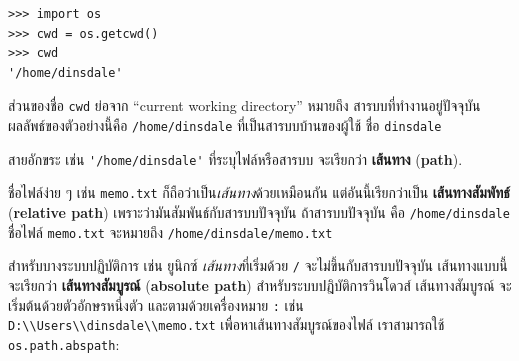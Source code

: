 \begin{verbatim}
>>> import os
>>> cwd = os.getcwd()
>>> cwd
'/home/dinsdale'
\end{verbatim}
%
%
ส่วนของชื่อ \texttt{cwd} ย่อจาก ``current working directory'' หมายถึง สารบบที่ทำงานอยู่ปัจจุบัน
ผลลัพธ์ของตัวอย่างนี้คือ \texttt{/home/dinsdale}
ที่เป็นสารบบบ้านของผู้ใช้ ชื่อ \texttt{dinsdale}


สายอักขระ เช่น \verb|'/home/dinsdale'| ที่ระบุไฟล์หรือสารบบ
จะเรียกว่า \textbf{เส้นทาง} (\textbf{path}).


ชื่อไฟล์ง่าย ๆ เช่น \texttt{memo.txt} ก็ถือว่าเป็น\textit{เส้นทาง}ด้วยเหมือนกัน
แต่อันนี้เรียกว่าเป็น \textbf{เส้นทางสัมพัทธ์} (\textbf{relative path})
เพราะว่ามันสัมพันธ์กับสารบบปัจจุบัน
ถ้าสารบบปัจจุบัน คือ \texttt{/home/dinsdale}
ชื่อไฟล์ \texttt{memo.txt} จะหมายถึง
\texttt{/home/dinsdale/memo.txt}
 
 
 
 


สำหรับบางระบบปฏิบัติการ เช่น ยูนิกซ์
\textit{เส้นทาง}ที่เริ่มด้วย \texttt{/}
จะไม่ขึ้นกับสารบบปัจจุบัน
เส้นทางแบบนี้ จะเรียกว่า \textbf{เส้นทางสัมบูรณ์} (\textbf{absolute path})
%
สำหรับระบบปฎิบัติการวินโดวส์
เส้นทางสัมบูรณ์ จะเริ่มต้นด้วยตัวอักษรหนึ่งตัว
และตามด้วยเครื่องหมาย \texttt{:} เช่น \verb|D:\\Users\\dinsdale\\memo.txt|
%
เพื่อหาเส้นทางสัมบูรณ์ของไฟล์
เราสามารถใช้ \texttt{os.path.abspath}:

